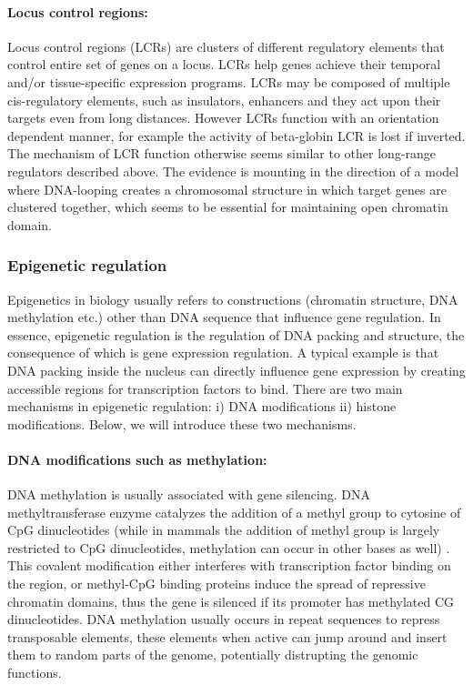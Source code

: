 \documentclass[12pt,]{krantz}
\let\oldparagraph\paragraph
\renewcommand{\paragraph}[1]{\oldparagraph{#1}\mbox{}}
\begin{document}
\hypertarget{locus-control-regions}{%
\paragraph{Locus control regions:}\label{locus-control-regions}}

Locus control regions (LCRs) are clusters of
different regulatory elements that control entire set of genes on a locus. LCRs
help genes achieve their temporal and/or tissue-specific expression programs.
LCRs may be composed of multiple cis-regulatory elements, such as insulators,
enhancers and they act upon their targets even from long distances. However
LCRs function with an orientation dependent manner, for example the activity of
beta-globin LCR is lost if inverted. The mechanism of LCR function otherwise
seems similar to other long-range regulators described above. The evidence is
mounting in the direction of a model where DNA-looping creates a chromosomal
structure in which target genes are clustered together, which seems to be
essential for maintaining open chromatin domain.

\hypertarget{epigenetic-regulation}{%
\subsubsection{Epigenetic regulation}\label{epigenetic-regulation}}

Epigenetics in biology usually refers to
constructions (chromatin structure, DNA methylation etc.) other than DNA
sequence that influence gene regulation. In essence, epigenetic regulation is
the regulation of DNA packing and structure, the consequence of which is gene
expression regulation. A typical example is that DNA packing inside the nucleus can
directly influence gene expression by creating accessible regions for transcription
factors to bind.
There are two main mechanisms in
epigenetic regulation: i) DNA modifications ii) histone modifications. Below,
we will introduce these two mechanisms.

\hypertarget{dna-modifications-such-as-methylation}{%
\paragraph{DNA modifications such as methylation:}\label{dna-modifications-such-as-methylation}}

DNA methylation is usually associated with gene silencing.
DNA methyltransferase enzyme catalyzes the addition of a methyl group to cytosine of
CpG dinucleotides (while in mammals the addition of methyl group is largely
restricted to CpG dinucleotides, methylation can occur in other bases as well)
. This covalent modification either interferes with transcription factor
binding on the region, or methyl-CpG binding proteins induce the spread of
repressive chromatin domains, thus the gene is silenced if its promoter has
methylated CG dinucleotides. DNA methylation usually occurs in repeat
sequences to repress transposable elements, these elements when active can
jump around and insert them to random parts of the genome, potentially distrupting
the genomic functions.
\end{document}
